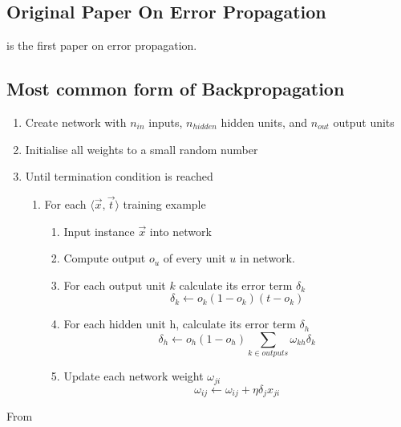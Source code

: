 \documentclass[10pt,a4paper]{article}
\begin{document}
\subsection{Original Paper On Error Propagation}
\cite{rumel} is the first paper on error propagation.

\subsection{Most common form of Backpropagation}
\begin{enumerate}
\item Create network with $n_{in}$ inputs, $n_{hidden}$ hidden units, and $n_{out}$ output units
\item Initialise all weights to a small random number 
\item Until termination condition is reached
    \begin{enumerate}
    \item For each $\langle\vec{x},\vec{t}\rangle$ training example
         \begin{enumerate}
         \item Input instance $\vec{x}$ into network
         \item Compute output $o_u$ of every unit $u$ in network.
         \item For each output unit $k$ calculate its error term $\delta_k$
             \begin{equation}
             \delta_k \leftarrow o_k(1-o_k)(t-o_k)
             \end{equation}
         \item For each hidden unit h, calculate its error term $\delta_h$
             \begin{equation}
             \delta_h \leftarrow o_h(1-o_h)\sum_{k\in outputs} \omega_{kh}\delta_k
             \end{equation}
         \item Update each network weight $\omega_{ji}$
             \begin{equation}
             \label{backpropupdate}
             \omega_{ij} \leftarrow \omega_{ij} + \eta \delta_j x_{ji}
             \end{equation}                                          
         \end{enumerate}                 
    \end{enumerate}
\end{enumerate}

From \cite[p98]{Michell2009}
\end{document}
